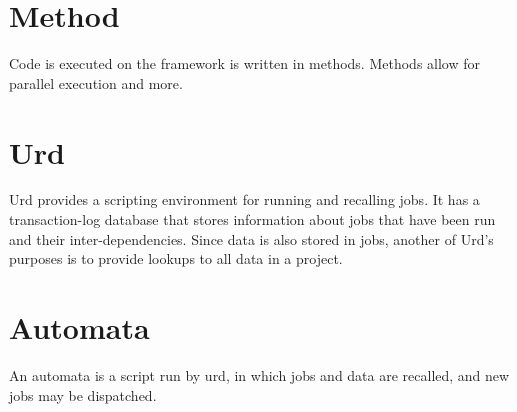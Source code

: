 \section{Method}

Code is executed on the framework is written in methods.  Methods
allow for parallel execution and more.



\section{Urd}

Urd provides a scripting environment for running and recalling jobs.
It has a transaction-log database that stores information about jobs
that have been run and their inter-dependencies.  Since data is also
stored in jobs, another of Urd's purposes is to provide lookups to all
data in a project.



\section{Automata}

An automata is a script run by urd, in which jobs and data are
recalled, and new jobs may be dispatched.
